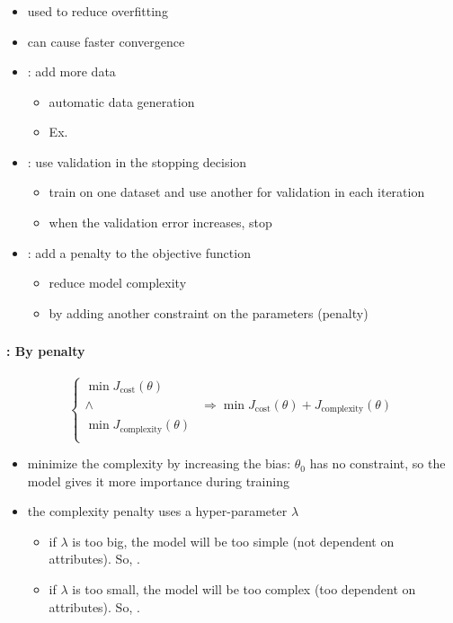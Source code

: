 \documentclass[xcolor=table]{beamer}%
\begin{document}
\begin{frame}
	\frametitle{\insertshortsubtitle}
	\framesubtitle{\insertsection}

	\begin{itemize}
		\item used to reduce overfitting
		\item can cause faster convergence
		\item {}: add more data
		\begin{itemize}
			\item automatic data generation
			\item Ex. 
		\end{itemize}
		\item {}: use validation in the stopping decision
		\begin{itemize}
			\item train on one dataset and use another for validation in each iteration
			\item when the validation error increases, stop
		\end{itemize}
		\item {}: add a penalty to the objective function
		\begin{itemize}
			\item reduce model complexity
			\item by adding another constraint on the parameters (penalty)
		\end{itemize}
	\end{itemize}
	
\end{frame}

\begin{frame}
	\frametitle{\insertshortsubtitle}
	\framesubtitle{\insertsection: By penalty}
	
	\[
	\begin{cases}
	\min J_\text{cost}(\theta) & \\
	\wedge  & \Rightarrow \min J_\text{cost}(\theta) + J_\text{complexity}(\theta)\\
	\min J_\text{complexity}(\theta) \\
	\end{cases}
	\]

	\begin{itemize}
		\item minimize the complexity by increasing the bias: $\theta_0$ has no constraint, so the model gives it more importance during training
		\item the complexity penalty uses a hyper-parameter $\lambda$
		\begin{itemize}
			\item if $\lambda$ is too big, the model will be too simple (not dependent on attributes). So, .
			\item if $\lambda$ is too small, the model will be too complex (too dependent on attributes). So, .
		\end{itemize}
	\end{itemize}
	
\end{frame}
\end{document}
